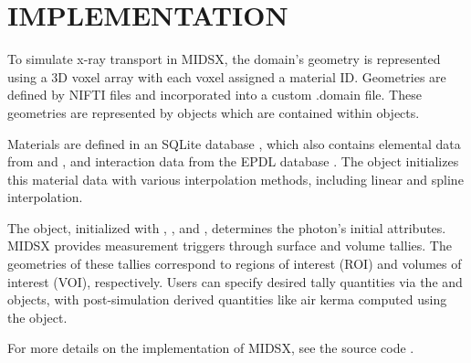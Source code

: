 \section{IMPLEMENTATION}
\par To simulate x-ray transport in MIDSX, the domain's geometry is represented using a 3D voxel array with each voxel assigned a material ID. Geometries are defined by NIFTI files \cite{nifti2004} and incorporated into a custom .domain file. These geometries are represented by  objects which are contained within  objects.
\par Materials are defined in an SQLite database \cite{sqlite2020hipp}, which also contains elemental data from \cite{periodictable2022} and \cite{mendeleev2021}, and interaction data from the EPDL database \cite{cullen_survey_nodate}. The  object initializes this material data with various interpolation methods, including linear and spline interpolation.
\par The  object, initialized with , , and , determines the photon's initial attributes. MIDSX provides measurement triggers through surface and volume tallies. The geometries of these tallies correspond to regions of interest (ROI) and volumes of interest (VOI), respectively. Users can specify desired tally quantities via the  and  objects, with post-simulation derived quantities like air kerma computed using the  object.
\par For more details on the implementation of MIDSX, see the source code \cite{MIDSX2023}.






